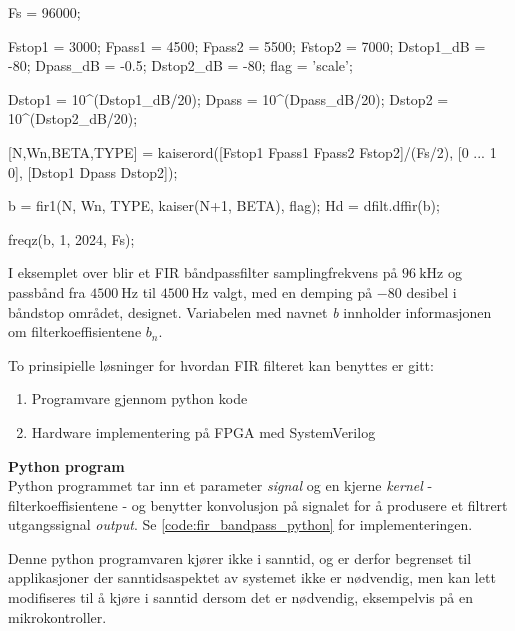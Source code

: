 \begin{matlabcode}
    Fs = 96000;  %

    Fstop1 = 3000;            %
    Fpass1 = 4500;            %
    Fpass2 = 5500;            %
    Fstop2 = 7000;            %
    Dstop1_dB = -80;          %
    Dpass_dB  = -0.5;         %
    Dstop2_dB = -80;          %
    flag   = 'scale';         %

    Dstop1 = 10^(Dstop1_dB/20);
    Dpass  = 10^(Dpass_dB/20);
    Dstop2 = 10^(Dstop2_dB/20);

    [N,Wn,BETA,TYPE] = kaiserord([Fstop1 Fpass1 Fpass2 Fstop2]/(Fs/2), 
    [0 ... 1 0], [Dstop1 Dpass Dstop2]);

    b  = fir1(N, Wn, TYPE, kaiser(N+1, BETA), flag);
    Hd = dfilt.dffir(b);

    freqz(b, 1, 2024, Fs);
\end{matlabcode}

I eksemplet over blir et FIR båndpassfilter samplingfrekvens på $\SI{96}{\kilo\hertz}$ og passbånd fra
$\SI{4500}{\hertz}$ til $\SI{4500}{\hertz}$ valgt, med en demping på $-80$ desibel i båndstop området, designet.
Variabelen med navnet \textit{b} innholder informasjonen om filterkoeffisientene $b_n$.

To prinsipielle løsninger for hvordan FIR filteret kan benyttes er gitt:
\begin{enumerate}
    \item Programvare gjennom python kode
    \item Hardware implementering på FPGA med SystemVerilog
\end{enumerate}

\textbf{Python program}\\
Python programmet tar inn et parameter \textit{signal} og en kjerne \textit{kernel} - filterkoeffisientene - og benytter 
konvolusjon på signalet for å produsere et filtrert utgangssignal \textit{output}. 
Se \ref{code:fir_bandpass_python} for implementeringen.

Denne python programvaren kjører ikke i sanntid, og er derfor begrenset til applikasjoner der sanntidsaspektet av 
systemet ikke er nødvendig, men kan lett modifiseres til å kjøre i sanntid dersom det er nødvendig, eksempelvis 
på en mikrokontroller. 

